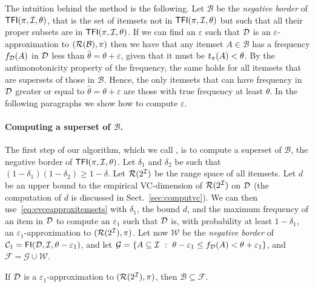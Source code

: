 The intuition behind the method is the following. Let $\mathcal{B}$ be the
\emph{negative border} of $\mathsf{TFI}(\pi,{\cal I},\theta)$, that is the set of itemsets
not in $\mathsf{TFI}(\pi,{\cal I},\theta)$ but such that all their proper subsets are in
$\mathsf{TFI}(\pi,{\cal I},\theta)$. If we can find an $\varepsilon$ such that ${\cal D}$ is an
$\varepsilon$-approximation to $(\mathcal{R}(\mathcal{B}),\pi)$ then we have that any
itemset $A\in\mathcal{B}$ has a frequency $f_{\cal D}(A)$ in ${\cal D}$ less than
$\hat{\theta}=\theta+\varepsilon$, given that it must be $t_\pi(A)<\theta$. By
the antimonotonicity property of the frequency, the same holds for all itemsets
that are supersets of those in $\mathcal{B}$. Hence, the only itemsets that can
have frequency in ${\cal D}$ greater or equal to $\hat{\theta}=\theta+\varepsilon$
are those with true frequency at least $\theta$. In the following paragraphs we
show how to compute $\varepsilon$.

\paragraph{Computing a superset of $\mathcal{B}$.} The first step of our
algorithm, which we call \ALG{}, is to compute a superset of $\mathcal{B}$, the
negative border of $\mathsf{TFI}(\pi,{\cal I},\theta)$. Let $\delta_1$ and $\delta_2$ be
such that $(1-\delta_1)(1-\delta_2)\ge 1-\delta$. Let $\mathcal{R}(2^{\cal I})$ be the
range space of all itemsets. Let $d$ be an upper bound to the empirical
VC-dimension of $\mathcal{R}(2^{\cal I})$ on ${\cal D}$ (the computation of $d$ is discussed in
Sect.~\ref{sec:computvc}). We can then use~\eqref{eq:evceapproxitemsets}
with $\delta_1$, the bound $d$, and the maximum frequency of an item in ${\cal D}$ to
compute an $\varepsilon_1$ such that ${\cal D}$ is, with probability at least
$1-\delta_1$, an $\varepsilon_1$-approximation to $(\mathcal{R}(2^{\cal I}),\pi)$. Let
now $\mathcal{W}$ be the \emph{negative border} of
$\mathcal{C}_1=\mathsf{FI}({\cal D},{\cal I},\theta-\varepsilon_1)$, and let
$\mathcal{G}=\{A\subseteq{\cal I} ~:~ \theta-\varepsilon_1\le
f_{\cal D}(A)<\theta+\varepsilon_1\}$, and $\mathcal{F}=\mathcal{G}\cup\mathcal{W}$.

\begin{fact}\label{fact:supersetborder}
	If ${\cal D}$ is a $\varepsilon_1$-approximation to $(\mathcal{R}(2^{\cal I}),\pi)$,
	then $\mathcal{B}\subseteq\mathcal{F}$.
\end{fact}

